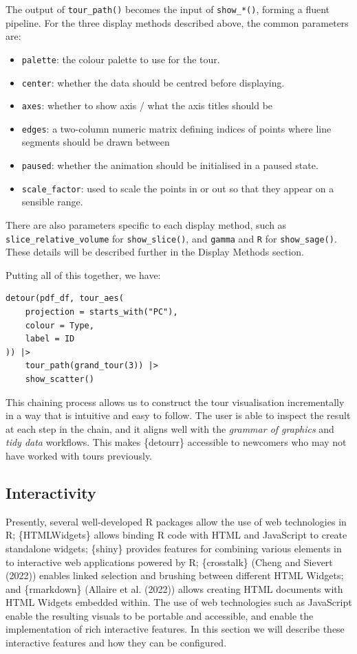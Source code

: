 The output of \texttt{tour\_path()} becomes the input of \texttt{show\_*()}, forming a fluent pipeline. For the three display methods described above, the common parameters are:

\begin{itemize}
\tightlist
\item
  \texttt{palette}: the colour palette to use for the tour.
\item
  \texttt{center}: whether the data should be centred before displaying.
\item
  \texttt{axes}: whether to show axis / what the axis titles should be
\item
  \texttt{edges}: a two-column numeric matrix defining indices of points where line segments should be drawn between
\item
  \texttt{paused}: whether the animation should be initialised in a paused state.
\item
  \texttt{scale\_factor}: used to scale the points in or out so that they appear on a sensible range.
\end{itemize}

There are also parameters specific to each display method, such as \texttt{slice\_relative\_volume} for \texttt{show\_slice()}, and \texttt{gamma} and \texttt{R} for \texttt{show\_sage()}. These details will be described further in the Display Methods section.

Putting all of this together, we have:

\begin{verbatim}
detour(pdf_df, tour_aes(
    projection = starts_with("PC"),
    colour = Type,
    label = ID
)) |>
    tour_path(grand_tour(3)) |>
    show_scatter()
\end{verbatim}

This chaining process allows us to construct the tour visualisation incrementally in a way that is intuitive and easy to follow. The user is able to inspect the result at each step in the chain, and it aligns well with the \emph{grammar of graphics} and \emph{tidy data} workflows. This makes \{detourr\} accessible to newcomers who may not have worked with tours previously.

\hypertarget{interactivity}{%
\subsection{Interactivity}\label{interactivity}}

Presently, several well-developed R packages allow the use of web technologies in R; \{HTMLWidgets\} allows binding R code with HTML and JavaScript to create standalone widgets; \{shiny\} provides features for combining various elements in to interactive web applications powered by R; \{crosstalk\} (Cheng and Sievert (2022)) enables linked selection and brushing between different HTML Widgets; and \{rmarkdown\} (Allaire et al. (2022)) allows creating HTML documents with HTML Widgets embedded within. The use of web technologies such as JavaScript enable the resulting visuals to be portable and accessible, and enable the implementation of rich interactive features. In this section we will describe these interactive features and how they can be configured.

